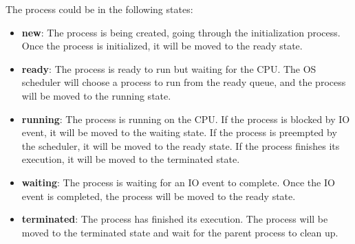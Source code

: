 \documentclass[a4paper,12pt]{article}
\begin{document}
The process could be in the following states:
\begin{itemize}
	\item \textbf{new}: The process is being created, going through the initialization process. Once the process is initialized, it will be moved to the ready state.
	\item \textbf{ready}: The process is ready to run but waiting for the CPU. The OS scheduler will choose a process to run from the ready queue, and the process will be moved to the running state.
	\item \textbf{running}: The process is running on the CPU. If the process is blocked by IO event, it will be moved to the waiting state. If the process is preempted by the scheduler, it will be moved to the ready state. If the process finishes its execution, it will be moved to the terminated state.
	\item \textbf{waiting}: The process is waiting for an IO event to complete. Once the IO event is completed, the process will be moved to the ready state.
	\item \textbf{terminated}: The process has finished its execution. The process will be moved to the terminated state and wait for the parent process to clean up.
\end{itemize}
\end{document}
